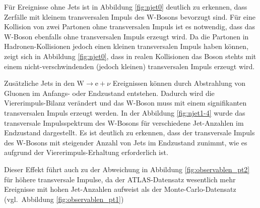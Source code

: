 \documentclass[11pt, a4paper]{article}
\numberwithin{equation}{section}
\begin{document}
Für Ereignisse ohne Jets ist in Abbildung \ref{fig:njet0} deutlich zu erkennen, dass Zerfälle mit kleinem transversalen Impuls des W-Bosons bevorzugt sind.
Für eine Kollision von zwei Partonen ohne transversalen Impuls ist es notwendig, dass das W-Boson ebenfalls ohne transversalen Impuls erzeugt wird.
Da die Partonen in Hadronen-Kollisionen jedoch einen kleinen transversalen Impuls haben können, zeigt sich in Abbildung \ref{fig:njet0}, dass in realen Kollisionen das Boson stehts mit einem nicht-ver\-schwin\-den\-den (jedoch kleinen) transversalen Impuls erzeugt wird.

Zusätzliche Jets in den $\mathrm{W} \rightarrow \mathrm{e} + \nu$ Ereignissen können durch Abstrahlung von Gluonen im Anfangs- oder Endzustand entstehen.
Dadurch wird die Viererimpuls-Bilanz verändert und das W-Boson muss mit einem signifikanten transversalen Impuls erzeugt werden.
In der Abbildung \ref{fig:njet1-4} wurde das transversale Impulsspektrum des W-Bosons für verschiedene Jet-Anzahlen im Endzustand dargestellt.
Es ist deutlich zu erkennen, dass der transversale Impuls des W-Bosons mit steigender Anzahl von Jets im Endzustand zunimmt, wie es aufgrund der Viererimpuls-Erhaltung erforderlich ist.

Dieser Effekt führt auch zu der Abweichung in Abbildung \ref{fig:observablen_pt2} für höhere transversale Impulse, da der ATLAS-Datensatz wesentlich mehr Ereignisse mit hohen Jet-Anzahlen aufweist als der Monte-Carlo-Datensatz (vgl.\ Abbildung \ref{fig:observablen_pt1})


\clearpage
\end{document}
